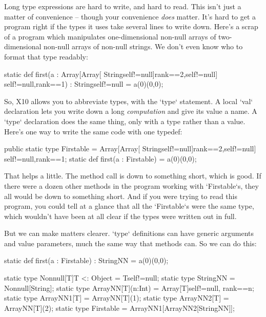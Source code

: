 Long type expressions are hard to write, and hard to read.  This isn't just a
matter of convenience -- though your convenience {\em does} matter.  It's hard
to get a program right if the types it uses take several lines to write down.
Here's a scrap of a program which manipulates one-dimensional non-null arrays
of two-dimensional non-null arrays of non-null strings.  We don't even know
who to format that type readably: 
\begin{xtennum}[]
static def first(a : Array[Array[
       String{self!=null}]{rank==2,self!=null}]
       {self!=null,rank==1})
 : String{self!=null} = a(0)(0,0); 
\end{xtennum}

So, X10 allows you to abbreviate types, with the \xcd`type` statement.
A local \xcd`val` declaration lets you write down a long {\em computation} and
give its value a name.  A \xcd`type` declaration does the same thing, only
with a type rather than a value.  Here's one way to write the same code 
with one typedef: 
\begin{xtennum}[]
public static type Firstable = Array[Array[
   String{self!=null}]{rank==2,self!=null}]
   {self!=null,rank==1};
static def first(a : Firstable) = a(0)(0,0);
\end{xtennum}

That helps a little.  The method call is down to something short, which is
good.  If there were a dozen other methods in the program working with
\xcd`Firstable`s, they all would be down to something short.  And if you were
trying to read this program, you could tell at a glance that all the
\xcd`Firstable`s were the same type, which wouldn't have been at all clear if
the types were written out in full.

But we can make matters clearer. \xcd`type` definitions can have generic
arguments and value parameters, much the same way that methods can.  So we can
do this:
\begin{xtennum}[]
static def first(a : Firstable) : StringNN = a(0)(0,0);

static type Nonnull[T]{T <: Object} = T{self!=null};
static type StringNN = Nonnull[String];
static type ArrayNN[T](n:Int) = Array[T]{self!=null, rank==n};
static type ArrayNN1[T] = ArrayNN[T](1);
static type ArrayNN2[T] = ArrayNN[T](2);
static type Firstable = ArrayNN1[ArrayNN2[StringNN]];
\end{xtennum}

